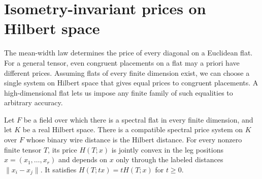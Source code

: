 \section{Isometry-invariant prices on Hilbert space}
\label{sec:hilbert}

The mean-width law determines the price of every diagonal on a
Euclidean flat. For a general tensor, even congruent placements on
a flat may a priori have different prices. Assuming flats of every
finite dimension exist, we can choose a single system on Hilbert space
that gives equal prices to congruent placements. A high-dimensional
flat lets us impose any finite family of such equalities to arbitrary
accuracy.

\begin{theorem}\label{thm:hilbert}
Let $F$ be a field over which there is a spectral flat in every
finite dimension, and let $K$ be a real Hilbert space. There is a
compatible spectral price system on $K$ over $F$ whose binary wire
distance is the Hilbert distance. For every nonzero finite tensor $T$,
its price $H(T;x)$ is jointly convex in the leg positions
$x=(x_1,\ldots,x_r)$ and depends on $x$ only through the labeled
distances $\|x_i-x_j\|$. It satisfies $H(T;tx)=tH(T;x)$ for $t\ge0$.
\end{theorem}

